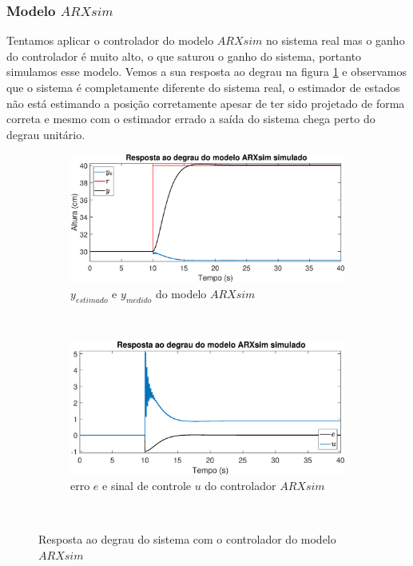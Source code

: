 \subsubsection{Modelo $ARXsim$}

Tentamos aplicar o controlador do modelo $ARXsim$ no sistema real mas o ganho do controlador é muito alto, o que saturou o ganho do sistema, portanto simulamos esse modelo. Vemos a sua resposta ao degrau na figura \ref{fig:stepsarxsimy} e observamos que o sistema é completamente diferente do sistema real, o estimador de estados não está estimando a posição corretamente apesar de ter sido projetado de forma correta e mesmo com o estimador errado a saída do sistema chega perto do degrau unitário.

\begin{figure}[htb]
	\centering
	\begin{subfigure}[t]{0.48\textwidth}
		\includegraphics[width=1\linewidth]{pasta1_figuras/stepsarxsimy}
		\caption[$y_{estimado}$ e $y_{medido}$ do modelo $ARX2$]{$y_{estimado}$ e $y_{medido}$ do modelo $ARXsim$}
		\label{fig:stepsarxsimy}
	\end{subfigure}
	~ %
	\begin{subfigure}[t]{0.48\textwidth}
		\includegraphics[width=1\linewidth]{pasta1_figuras/stepsarxsime}
		\caption[erro $e$ e sinal de controle $u$ do controlador $ARX2$]{erro $e$ e sinal de controle $u$ do controlador $ARXsim$}
		\label{fig:stepsarxsime}
	\end{subfigure}
	~ %
	
	\caption{Resposta ao degrau do sistema com o controlador do modelo $ARXsim$}\label{fig:stepsarxsim}
\end{figure}

